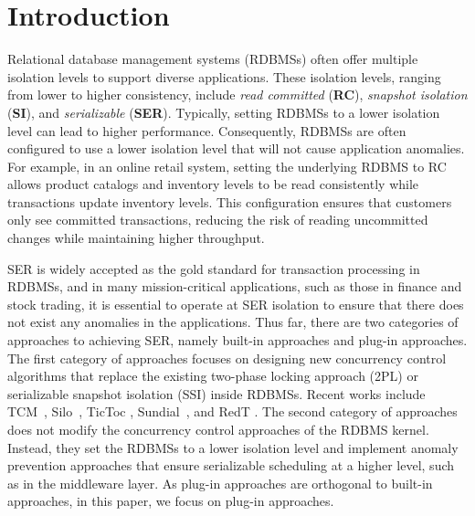 \section{Introduction}
Relational database management systems (RDBMSs) often offer multiple isolation levels to support diverse applications. These isolation levels, ranging from lower to higher consistency, include \textit{read committed} ({\bf RC}), \textit{snapshot isolation} ({\bf SI}), and \textit{serializable} ({\bf SER}).
Typically, setting RDBMSs to a lower isolation level can lead to higher performance. Consequently, RDBMSs are often configured to use a lower isolation level that will not cause application anomalies.
For example, in an online retail system, setting the underlying RDBMS to RC allows product catalogs and inventory levels to be read consistently while transactions update inventory levels. This configuration ensures that customers only see committed transactions, reducing the risk of reading uncommitted changes while maintaining higher throughput.

SER is widely accepted as the gold standard for transaction processing in RDBMSs, and in many mission-critical applications, such as those in finance and stock trading, it is essential to operate at SER isolation to ensure that there does not exist any anomalies in the applications.
Thus far, there are two categories of approaches to achieving SER, namely built-in approaches and plug-in approaches.
The first category of approaches focuses on designing new concurrency control algorithms that replace the existing two-phase locking approach (2PL) or serializable snapshot isolation (SSI) inside RDBMSs. 
Recent works include TCM~\cite{DBLP:conf/icde/LometFWW12}, Silo~\cite{DBLP:conf/sosp/TuZKLM13}, TicToc \cite{DBLP:conf/sigmod/YuPSD16}, Sundial~\cite{DBLP:journals/pvldb/YuXPSRD18}, and RedT \cite{DBLP:journals/pvldb/ZhangLZXLXHYD23}.
The second category of approaches does not modify the concurrency control approaches of the RDBMS kernel. Instead, they set the RDBMSs to a lower isolation level and 
implement anomaly prevention approaches that ensure serializable scheduling at a higher level, such as in the middleware layer.
As plug-in approaches are orthogonal to built-in approaches, in this paper, we focus on plug-in approaches. 

